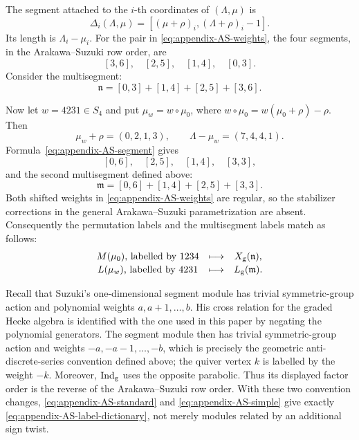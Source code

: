 \documentclass[11pt]{amsart}
\theoremstyle{definition}
\theoremstyle{remark}
\begin{document}
The segment attached to the $i$-th coordinates of $(\Lambda,\mu)$ is
\begin{equation}\label{eq:appendix-AS-segment}
 \Delta_i(\Lambda,\mu)
 =[(\mu+\rho)_i,(\Lambda+\rho)_i-1].
\end{equation}
Its length is $\Lambda_i-\mu_i$.  For the pair in
\eqref{eq:appendix-AS-weights}, the four segments, in the
Arakawa--Suzuki row order, are
\[
 [3,6],\quad[2,5],\quad[1,4],\quad[0,3].
\]
Consider the multisegment:
\[
 \mathfrak n=[0,3]+[1,4]+[2,5]+[3,6].
\]

Now let $w=4231\in S_4$ and put $\mu_w=w\circ\mu_0$, where
$w\circ\mu_0=w(\mu_0+\rho)-\rho$.  Then
\[
 \mu_w+\rho=(0,2,1,3),
 \qquad
 \Lambda-\mu_w=(7,4,4,1).
\]
Formula~\eqref{eq:appendix-AS-segment} gives
\[
 [0,6],\quad[2,5],\quad[1,4],\quad[3,3],
\]
and the second multisegment defined above:
\[
 \mathfrak m=[0,6]+[1,4]+[2,5]+[3,3].
\]
Both shifted weights in \eqref{eq:appendix-AS-weights} are regular, so the
stabilizer corrections in the general Arakawa--Suzuki parametrization are
absent.  Consequently the permutation labels and the multisegment labels
match as follows:
\begin{equation}\label{eq:appendix-AS-label-dictionary}
 \begin{array}{c@{\quad\longmapsto\quad}c}
  M(\mu_0)\text{, labelled by }1234&X_{\rm g}(\mathfrak n),\\[2pt]
  L(\mu_w)\text{, labelled by }4231&L_{\rm g}(\mathfrak m).
 \end{array}
\end{equation}

Recall that  Suzuki's one-dimensional segment
module has trivial symmetric-group action and polynomial weights
$a,a+1,\ldots,b$.  His cross relation for the graded Hecke algebra is identified with the one used in
this paper by negating the polynomial generators.  The segment module then
has trivial symmetric-group action and weights
$-a,-a-1,\ldots,-b$, which is precisely the geometric
anti-discrete-series convention defined above; the quiver vertex $k$ is
labelled by
the weight $-k$.  Moreover, $\operatorname{Ind}_{\rm g}$ uses the opposite
parabolic.  Thus its displayed factor order is the reverse of the
Arakawa--Suzuki row order.  With these two convention changes,
\eqref{eq:appendix-AS-standard} and
\eqref{eq:appendix-AS-simple} give exactly
\eqref{eq:appendix-AS-label-dictionary}, not merely modules related by an
additional sign twist.
\end{document}
